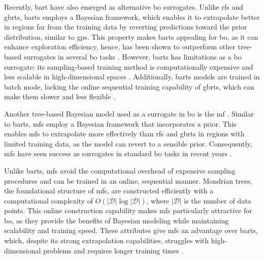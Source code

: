 Recently, \ac{bart} have also emerged as alternative \ac{bo} surrogates. Unlike \acp{rf} and \acp{gbrt}, \acp{bart} employs a Bayesian framework, which enables it to extrapolate better in regions far from the training data by reverting predictions toward the prior distribution, similar to \acp{gp}. This property makes \acp{bart} appealing for \ac{bo}, as it can enhance exploration efficiency, hence, has been shown to outperform other tree-based surrogates in several \ac{bo} tasks \citep{lei2021bayesian}. However, \acp{bart} has limitations as a \ac{bo} surrogate: its sampling-based training method is computationally expensive and less scalable in high-dimensional spaces \citep{scillitoe2021uncertainty}. Additionally, \acp{bart} models are trained in batch mode, lacking the online sequential training capability of \acp{gbrt}, which can make them slower and less flexible \cite{kim2022uncertainty}.


Another tree-based Bayesian model used as a surrogate in \ac{bo} is the \ac{mf} \citep{lakshminarayanan2014mondrian}. Similar to \acp{bart}, \acp{mf} employ a Bayesian framework that incorporates a prior. This enables \acp{mf} to extrapolate more effectively than \acp{rf} and \acp{gbrt} in regions with limited training data, as the model can revert to a sensible prior. Consequently, \acp{mf} have seen success as surrogates in standard \ac{bo} tasks in recent years \cite{scillitoe2021uncertainty}. 

Unlike \acp{bart}, \acp{mf} avoid the computational overhead of expensive sampling procedures and can be trained in an online, sequential manner. Mondrian trees, the foundational structure of \acp{mf}, are constructed efficiently with a computational complexity of \(O(\lvert \mathcal{D} \rvert \log \lvert \mathcal{D} \rvert)\), where \(\lvert \mathcal{D} \rvert\) is the number of data points. This online construction capability makes \acp{mf} particularly attractive for \ac{bo}, as they provide the benefits of Bayesian modeling while maintaining scalability and training speed. These attributes give \acp{mf} an advantage over \acp{bart}, which, despite its strong extrapolation capabilities, struggles with high-dimensional problems and requires longer training times \cite{kim2022uncertainty}. 





